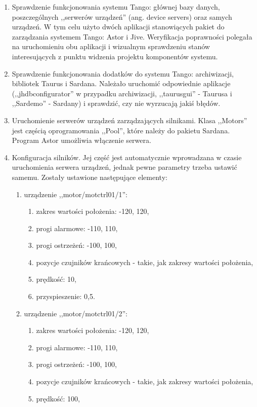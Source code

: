 \begin{enumerate}
	\item Sprawdzenie funkcjonowania systemu Tango: głównej bazy danych, poszczególnych ,,serwerów urządzeń'' (ang. device servers) oraz samych urządzeń. W tym celu użyto dwóch aplikacji stanowiących pakiet do zarządzania systemem Tango: Astor i Jive. Weryfikacja poprawności polegała na uruchomieniu obu aplikacji i wizualnym sprawdzeniu stanów interesujących z punktu widzenia projektu komponentów systemu.
	\item Sprawdzenie funkcjonowania dodatków do systemu Tango: archiwizacji, bibliotek Taurus i Sardana. Należało uruchomić odpowiednie aplikacje (,,jhdbconfigurator'' w przypadku archiwizacji, ,,taurusgui'' - Taurusa i ,,Sardemo'' - Sardany) i sprawdzić, czy nie wyrzucają jakiś błędów.
	\item Uruchomienie serwerów urządzeń zarządzających silnikami. Klasa ,,Motors'' jest częścią oprogramowania ,,Pool'', które należy do pakietu Sardana. Program Astor umożliwia włączenie serwera.
	\item Konfiguracja silników. Jej część jest automatycznie wprowadzana w czasie uruchomienia serwera urządzeń, jednak pewne parametry trzeba ustawić samemu. Zostały ustawione następujące elementy:
	\begin{enumerate}
		\item urządzenie ,,motor/motctrl01/1'':
		\begin{enumerate}
			\item zakres wartości położenia: -120, 120,
			\item progi alarmowe: -110, 110,
			\item progi ostrzeżeń: -100, 100,
			\item pozycje czujników krańcowych - takie, jak zakresy wartości położenia,
			\item prędkość: 10,
			\item przyspieszenie: 0,5.
		\end{enumerate}
		\item urządzenie ,,motor/motctrl01/2'':
		\begin{enumerate}
			\item zakres wartości położenia: -120, 120,
			\item progi alarmowe: -110, 110,
			\item progi ostrzeżeń: -100, 100,
			\item pozycje czujników krańcowych - takie, jak zakresy wartości położenia,
			\item prędkość: 100,

\end{enumerate}
\end{enumerate}
\end{enumerate}
